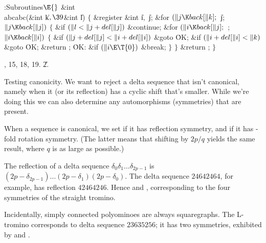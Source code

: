 \B{}:Subroutines\X${}\E{}$\6
\&{int} \\{abcabc}(\&{int} \|k${},\39{}$\&{int} \|l)\1\1\2\2\6
${}\{{}$\1\6
\&{register} \&{int} \|i${},{}$ \|j;\7
\&{for} ${}(\|j\K\\{back}[\|k];{}$ \|j; ${}\|j\K\\{back}[\|j]){}$\5
${}\{{}$\1\6
\&{if} ${}(\|l<\|j+\\{del}[\|j]){}$\1\5
\&{continue};\2\6
\&{for} ${}(\|i\K\\{back}[\|j];{}$  ; ${}\|i\K\\{back}[\|i]){}$\5
${}\{{}$\1\6
\&{if} ${}(\|j+\\{del}[\|j]<\|i+\\{del}[\|i]){}$\1\5
\&{goto} \.{OK};\2\6
\&{if} ${}(\|i+\\{del}[\|i]<\|k){}$\1\5
\&{goto} \.{OK};\2\6
\&{return} ;\6
\4\.{OK}:\5
\&{if} ${}(\|i\E\T{0}){}$\1\5
\&{break};\2\6
\4${}\}{}$\2\6
\4${}\}{}$\2\6
\&{return} ;\6
\4${}\}{}$\2\par
{}, 15, 18, 19.
\U2.\fi

Testing canonicity. We want to reject a delta sequence that isn't
canonical, namely when it (or its reflection) has a cyclic shift
that's smaller. While we're doing this we can also determine any
automorphisms (symmetries) that are present.

When a sequence is canonical, we set  if it has reflection
symmetry,
and  if it has -fold rotation symmetry. (The latter
means
that shifting by $2p/q$ yields the same result, where $q$ is as large
as possible.)

The reflection of a delta sequence $\delta_0\delta_1\ldots\delta_{2p-1}$ is
$(2p-\delta_{2p-1})\ldots(2p-\delta_1)(2p-\delta_0)$. The delta sequence
$24642464$, for example, has reflection $42464246$.
Hence  and , corresponding to the
four symmetries
of the straight tromino.

Incidentally, simply connected polyominoes are always squaregraphs.
The L-tromino corresponds to delta sequence $23635256$; it has
two symmetries, exhibited by  and .

